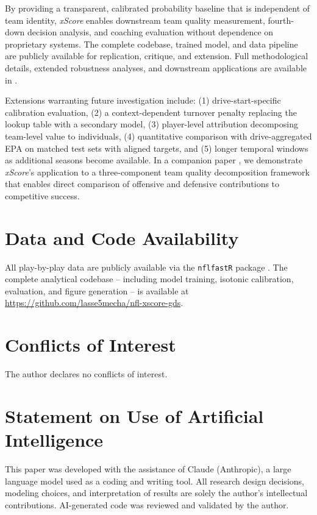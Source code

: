 \documentclass[12pt,a4paper]{article}
\newcommand{\xscore}{\textit{xScore}}
\begin{document}
By providing a transparent, calibrated probability baseline that is independent of team identity, \xscore{} enables downstream team quality measurement, fourth-down decision analysis, and coaching evaluation without dependence on proprietary systems. The complete codebase, trained model, and data pipeline are publicly available for replication, critique, and extension. Full methodological details, extended robustness analyses, and downstream applications are available in \citet{mecha2026xscore}.

Extensions warranting future investigation include: (1) drive-start-specific calibration evaluation, (2) a context-dependent turnover penalty replacing the lookup table with a secondary model, (3) player-level attribution decomposing team-level value to individuals, (4) quantitative comparison with drive-aggregated EPA on matched test sets with aligned targets, and (5) longer temporal windows as additional seasons become available. In a companion paper \citep{mecha2026gds}, we demonstrate \xscore{}'s application to a three-component team quality decomposition framework that enables direct comparison of offensive and defensive contributions to competitive success.

\section*{Data and Code Availability}

All play-by-play data are publicly available via the \texttt{nflfastR} package \citep{carl2021nflfastr}. The complete analytical codebase -- including model training, isotonic calibration, evaluation, and figure generation -- is available at \url{https://github.com/lasse5mecha/nfl-xscore-gds}.

\section*{Conflicts of Interest}

The author declares no conflicts of interest.

\section*{Statement on Use of Artificial Intelligence}

This paper was developed with the assistance of Claude (Anthropic), a large language model used as a coding and writing tool. All research design decisions, modeling choices, and interpretation of results are solely the author's intellectual contributions. AI-generated code was reviewed and validated by the author.

\printbibliography
\end{document}

